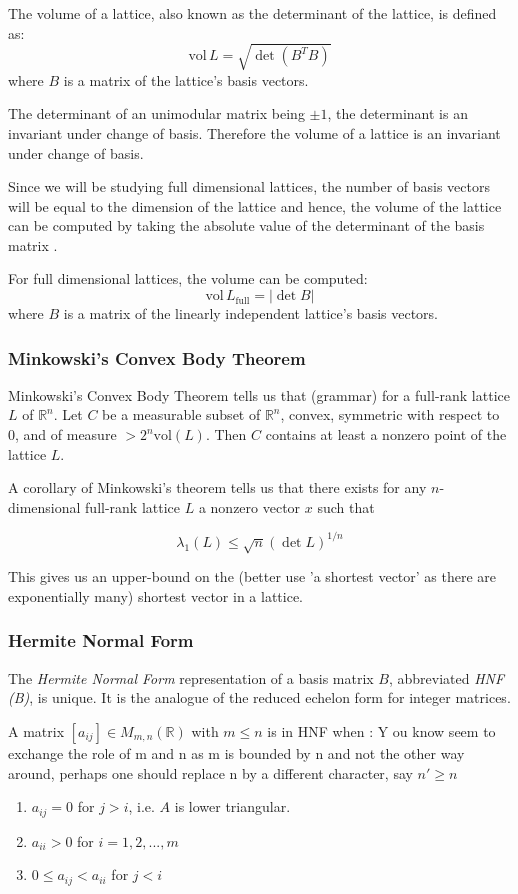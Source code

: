 \documentclass[10pt, a4paper]{article}
\newcommand{\my}[1]{{\color{blue} #1 }}
\begin{document}
The volume of a lattice, also known as the determinant of the lattice, is defined as:
\[
\text{vol} \,L = \sqrt{\det(B^T B)}
\] where $B$ is a matrix of the lattice's basis vectors.


The determinant of an unimodular matrix being $\pm 1$, the determinant is an invariant under change of basis. Therefore the volume of a lattice is an invariant under change of basis.

Since we will be studying full dimensional lattices, the number of basis vectors will be equal to the dimension of the lattice and hence, the volume of the lattice can be computed by taking the absolute value of the determinant \my{of the basis matrix}.

For full dimensional lattices, the volume can be computed:
\[
\text{vol} \,L_{\text{full}} = |\det B|
\] where $B$ is a matrix of the linearly independent lattice's basis vectors.


\subsubsection{Minkowski's Convex Body Theorem}

Minkowski's Convex Body Theorem tells us \my{that (grammar)} for a full-rank lattice $L$ of $\mathbb{R}^n$. Let $C$ be a measurable subset of $\mathbb{R}^n$, convex, symmetric with respect to 0, and of measure $> 2^n \text{vol}(L)$. Then $C$ contains at least a nonzero point of the lattice $L$.

A corollary of Minkowski's theorem tells us that there exists for any $n$-dimensional full-rank lattice $L$ a nonzero vector $x$ such that

\[
\lambda_1(L) \leq \sqrt{n} (\det L)^{1/n}
\]

This gives us an upper-bound on \my{ the (better use 'a shortest vector' as there are exponentially many)} shortest vector in a lattice.

\subsubsection{Hermite Normal Form}

The \emph{Hermite Normal Form} representation of a basis matrix $B$, abbreviated \emph{HNF (B)}, is unique. It is the analogue of the reduced echelon form for integer matrices.

A matrix $[a_{ij}] \in M_{m,n} (\mathbb{R})$ with $m \leq n$ is in HNF when\cite{SchnorrStanfordNotes} : {\my You know seem to exchange the role of m and n as m is bounded by n and not the other way around, perhaps one should replace n by a different character, say $n' \geq n$}
\begin{enumerate}
\item $a_{ij} = 0$ for $j > i$, i.e. $A$ is lower triangular. 
\item $a_{ii} > 0$ for $i=1,2,...,m$
\item $0 \leq a_{ij} < a_{ii}$ for $j < i$
\end{enumerate}
\end{document}
